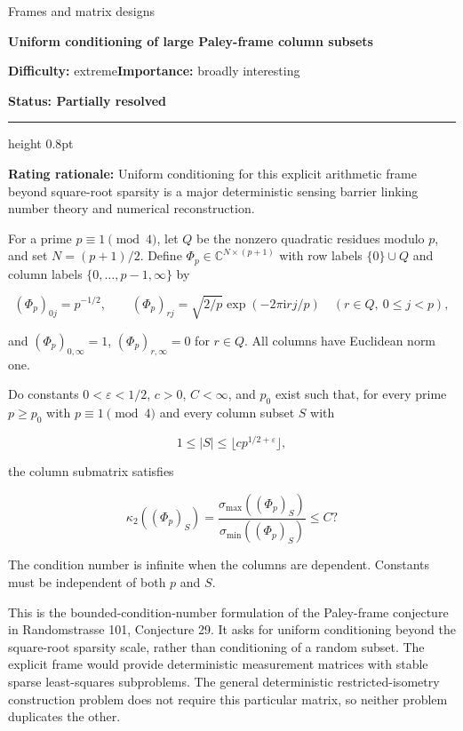 \documentclass[11pt,a4paper]{article}
\begin{document}
{\sffamily\small\color{muted}Frames and matrix designs\par}
\vspace{3pt}
{\raggedright{}\sffamily\bfseries\fontsize{21}{24}\selectfont\color{ink}Uniform
conditioning of large Paley-frame column subsets\par}
\vspace{7pt}
{\sffamily\small\textbf{Difficulty:} extreme\quad\textbf{Importance:} broadly
interesting\par}
{\sffamily\small\bfseries\color{accent}Status: Partially resolved\par}
\vspace{4pt}
{\color{accent}\hrule height 0.8pt}
\vspace{6pt}
\textbf{Rating rationale:} Uniform conditioning for this explicit
arithmetic frame beyond square-root sparsity is a major deterministic
sensing barrier linking number theory and numerical reconstruction.

For a prime \(p\equiv1\pmod4\), let \(Q\) be the nonzero quadratic
residues modulo \(p\), and set \(N=(p+1)/2\). Define
\(\Phi_p\in\mathbb C^{N\times(p+1)}\) with row labels \(\{0\}\cup Q\)
and column labels \(\{0,\ldots,p-1,\infty\}\) by

\[(\Phi_p)_{0j}=p^{-1/2},\qquad
(\Phi_p)_{rj}=\sqrt{2/p}\exp(-2\pi\mathrm i rj/p)
\quad(r\in Q,\ 0\leq j< p),\]

and \((\Phi_p)_{0,\infty}=1\), \((\Phi_p)_{r,\infty}=0\) for \(r\in Q\).
All columns have Euclidean norm one.

Do constants \(0<\varepsilon<1/2\), \(c>0\), \(C<\infty\), and \(p_0\)
exist such that, for every prime \(p\geq p_0\) with \(p\equiv1\pmod4\)
and every column subset \(S\) with

\[1\leq |S|\leq \lfloor c p^{1/2+\varepsilon}\rfloor,\]

the column submatrix satisfies

\[\kappa_2((\Phi_p)_S)
=\frac{\sigma_{\max}((\Phi_p)_S)}
{\sigma_{\min}((\Phi_p)_S)}\leq C?\]

The condition number is infinite when the columns are dependent.
Constants must be independent of both \(p\) and \(S\).

This is the bounded-condition-number formulation of the Paley-frame
conjecture in Randomstrasse 101, Conjecture 29. It asks for uniform
conditioning beyond the square-root sparsity scale, rather than
conditioning of a random subset. The explicit frame would provide
deterministic measurement matrices with stable sparse least-squares
subproblems. The general deterministic restricted-isometry construction
problem does not require this particular matrix, so neither problem
duplicates the other.
\end{document}

